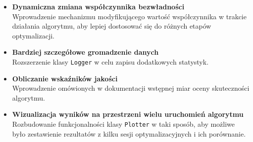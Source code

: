 \documentclass[12pt]{article}
\begin{document}
\begin{itemize}
	\item \textbf{Dynamiczna zmiana współczynnika bezwładności} \\
	      Wprowadzenie mechanizmu modyfikującego wartość współczynnika w trakcie działania algorytmu, aby lepiej dostosować się do różnych etapów optymalizacji.

	\item \textbf{Bardziej szczegółowe gromadzenie danych} \\
	      Rozszerzenie klasy \texttt{Logger} w celu zapisu dodatkowych statystyk.

	\item \textbf{Obliczanie wskaźników jakości} \\
	      Wprowadzenie omówionych w dokumentacji wstępnej miar oceny skuteczności algorytmu.

	\item \textbf{Wizualizacja wyników na przestrzeni wielu uruchomień algorytmu} \\
	      Rozbudowanie funkcjonalności klasy \texttt{Plotter} w taki sposób, aby możliwe było zestawienie rezultatów z kilku sesji optymalizacyjnych i ich porównanie.
\end{itemize}
\end{document}
